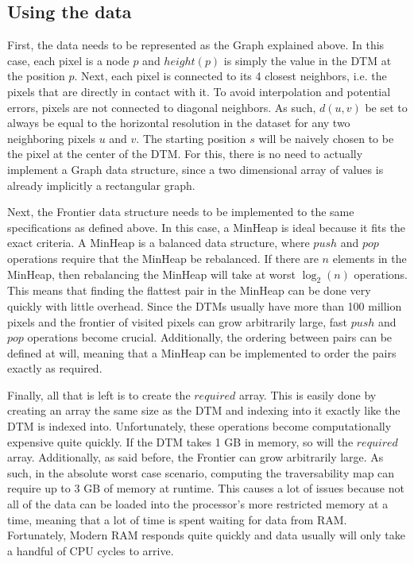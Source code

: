 \documentclass[12pt]{article}
\begin{document}
\subsection{Using the data}
\label{sub:using_the_data}
\par First, the data needs to be represented as the Graph explained above. In this case, each pixel is a node $p$ and $height(p)$ is simply the value in the DTM at the position $p$. Next, each pixel is connected to its 4 closest neighbors, i.e. the pixels that are directly in contact with it. To avoid interpolation and potential errors, pixels are not connected to diagonal neighbors. As such, $d(u,v)$ be set to always be equal to the horizontal resolution in the dataset for any two neighboring pixels $u$ and $v$. The starting position $s$ will be naively chosen to be the pixel at the center of the DTM. For this, there is no need to actually implement a Graph data structure, since a two dimensional array of values is already implicitly a rectangular graph.
\par Next, the Frontier data structure needs to be implemented to the same specifications as defined above. In this case, a MinHeap is ideal because it fits the exact criteria. A MinHeap is a balanced data structure, where $push$ and $pop$ operations require that the MinHeap be rebalanced. If there are $n$ elements in the MinHeap, then rebalancing the MinHeap will take at worst $\log_2(n)$ operations. This means that finding the flattest pair in the MinHeap can be done very quickly with little overhead. Since the DTMs usually have more than 100 million pixels and the frontier of visited pixels can grow arbitrarily large, fast $push$ and $pop$ operations become crucial. Additionally, the ordering between pairs can be defined at will, meaning that a MinHeap can be implemented to order the pairs exactly as required.
\par Finally, all that is left is to create the $required$ array. This is easily done by creating an array the same size as the DTM and indexing into it exactly like the DTM is indexed into. Unfortunately, these operations become computationally expensive quite quickly. If the DTM takes 1 GB in memory, so will the $required$ array. Additionally, as said before, the Frontier can grow arbitrarily large. As such, in the absolute worst case scenario, computing the traversability map can require up to 3 GB of memory at runtime. This causes a lot of issues because not all of the data can be loaded into the processor's more restricted memory at a time, meaning that a lot of time is spent waiting for data from RAM. Fortunately, Modern RAM responds quite quickly and data usually will only take a handful of CPU cycles to arrive.
\end{document}
